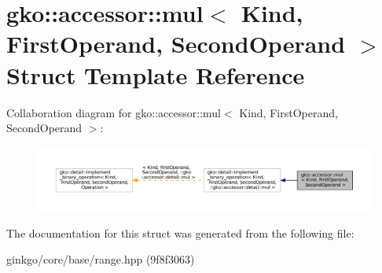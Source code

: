 \hypertarget{structgko_1_1accessor_1_1mul}{}\section{gko\+:\+:accessor\+:\+:mul$<$ Kind, First\+Operand, Second\+Operand $>$ Struct Template Reference}
\label{structgko_1_1accessor_1_1mul}


Collaboration diagram for gko\+:\+:accessor\+:\+:mul$<$ Kind, First\+Operand, Second\+Operand $>$\+:
\nopagebreak
\begin{figure}[H]
\begin{center}
\leavevmode
\includegraphics[width=350pt]{structgko_1_1accessor_1_1mul__coll__graph}
\end{center}
\end{figure}


The documentation for this struct was generated from the following file\+:\begin{DoxyCompactItemize}
\item 
ginkgo/core/base/range.\+hpp (9f8f3063)\end{DoxyCompactItemize}
